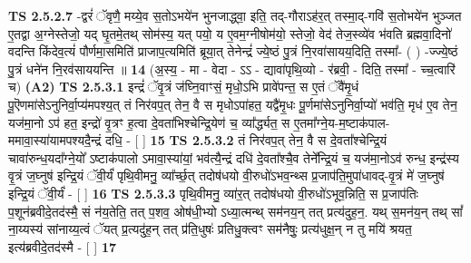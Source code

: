 \documentclass[17pt]{extarticle}
\begin{document}
                  \newline
                                \textbf{ TS 2.5.2.7} \newline
                  -द्वरं॑ ॅवृणै॒ मय्ये॒व स॒तोऽभये॑न भुनजाद्ध्वा॒ इति॒ तद्-गौराऽह॑र॒त् तस्मा॒द्-गवि॑ स॒तोभये॑न भुञ्जत ए॒तद्वा अ॒ग्नेस्तेजो॒ यद् घृ॒तमे॒तथ् सोम॑स्य॒ यत् पयो॒ य ए॒वम॒ग्नीषोम॑यो॒ स्तेजो॒ वेद॑ तेज॒स्व्ये॑व भ॑वति ब्रह्मवा॒दिनो॑ वदन्ति किंदेव॒त्यं॑ पौर्णमा॒समिति॑ प्राजाप॒त्यमिति॑ ब्रूया॒त् तेनेन्द्रं॑ ज्ये॒ष्ठं पु॒त्रं नि॒रवा॑सायय॒दिति॒ तस्मा᳚- ( ) -ज्ज्ये॒ष्ठं पु॒त्रं धने॑न नि॒रव॑साययन्ति ॥ \textbf{  14} \newline
                  \newline
                      (अ॒स्य॒ - मा - वेदा - ऽऽ - द्यावा॑पृथि॒व्यो - र॑ब्रवी॒ - दिति॒ तस्मा᳚ - च्च॒त्वारि॑ च)  \textbf{(A2)} \newline \newline
                                        \textbf{ TS 2.5.3.1} \newline
                  इन्द्रं॑ ॅवृ॒त्रं ज॑घ्नि॒वाꣳसं॒ मृधो॒ऽभि प्रावे॑पन्त॒ स ए॒तं ॅवै॑मृ॒धं पू॒ऎणमा॑सेऽनुनिर्वा॒प्य॑मपश्य॒त् तं निर॑वप॒त् तेन॒ वै स मृधोऽपा॑हत॒ यद्वै॑मृ॒धः पू॒र्णमा॑सेऽनुनिर्वा॒प्यो॑ भव॑ति॒ मृध॑ ए॒व तेन॒ यज॑मा॒नो ऽप॑ हत॒ इन्द्रो॑ वृ॒त्रꣳ ह॒त्वा दे॒वता॑भिश्चेन्द्रि॒येण॑ च॒ व्या᳚र्द्ध्यत॒ स ए॒तमा᳚ग्ने॒य-म॒ष्टाक॑पाल-ममावा॒स्या॑यामपश्यदै॒न्द्रं दधि॒ - [  ] \textbf{  15} \newline
                  \newline
                                \textbf{ TS 2.5.3.2} \newline
                  तं निर॑वप॒त् तेन॒ वै स दे॒वता᳚श्चेन्द्रि॒यं चावा॑रुन्ध॒यदा᳚ग्ने॒यो᳚ ऽष्टाक॑पालो ऽमावा॒स्या॑यां॒ भव॑त्यै॒न्द्रं दधि॑ दे॒वता᳚श्चै॒व तेने᳚न्द्रि॒यं च॒ यज॑मा॒नोऽव॑ रुन्ध॒ इन्द्र॑स्य वृ॒त्रं ज॒घ्नुष॑ इन्द्रि॒यं ॅवी॒र्यं॑ पृथि॒वीमनु॒ व्या᳚र्च्छ॒त् तदोष॑धयो वी॒रुधो॑ऽभव॒न्थ्स प्र॒जाप॑ति॒मुपा॑धावद्-वृ॒त्रं मे॑ ज॒घ्नुष॑ इन्द्रि॒यं ॅवी॒र्यं॑ - [  ] \textbf{  16} \newline
                  \newline
                                \textbf{ TS 2.5.3.3} \newline
                  पृथि॒वीमनु॒ व्या॑र॒त् तदोष॑धयो वी॒रुधो॑ऽभूव॒न्निति॒ स प्र॒जाप॑तिः प॒शून॑ब्रवीदे॒तद॑स्मै॒ सं न॑य॒तेति॒ तत् प॒शव॒ ओष॑धी॒भ्यो ऽध्या॒त्मन्थ् सम॑नय॒न् तत् प्रत्य॑दुह॒न॒. यथ् स॒मन॑य॒न् तथ् सां᳚ ना॒य्यस्य॑ सांनाय्य॒त्वं ॅयत् प्र॒त्यदु॑ह॒न् तत् प्र॑ति॒धुषः॑ प्रतिधु॒क्त्वꣳ सम॑नैषुः॒ प्रत्य॑धुक्ष॒न् न तु मयि॑ श्रयत॒ इत्य॑ब्रवीदे॒तद॑स्मै - [  ] \textbf{  17} \newline
\end{document}
